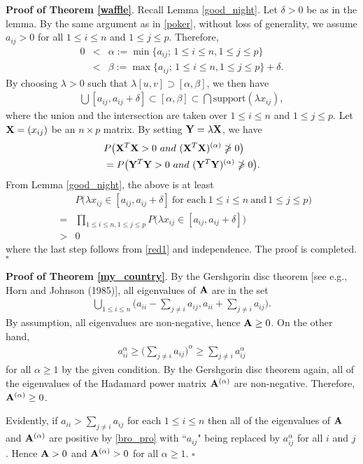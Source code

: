 \documentclass[conference,letterpaper]{IEEEtran}
\numberwithin{equation}{section}
\newcommand{\lbl}{\label}
\newcommand{\bd}{\bold}
\newcommand{\beaa}{\begin{eqnarray*}}
\newcommand{\eeaa}{\end{eqnarray*}}
\newcommand{\bea}{\begin{eqnarray}}
\newcommand{\eea}{\end{eqnarray}}
\begin{document}
\noindent\textbf{Proof of Theorem \ref{waffle}}. Recall Lemma \ref{good_night}. Let $\delta >0$ be as in the lemma. By the same argument as in \eqref{poker}, without loss of generality, we assume  $a_{ij}>0$ for all $1\leq i\leq n$ and $1\leq j \leq p.$ Therefore,
\beaa
0&<&\alpha:=\min\{a_{ij};\, 1\leq i \leq n, 1\leq j \leq p\}\\
&<& \beta:=\max\{a_{ij};\, 1\leq i\leq n, 1\leq j \leq p\}+\delta.
\eeaa
By choosing $\lambda>0$ such that $\lambda [u, v]\supset [\alpha , \beta]$, we then have
\bea\lbl{red1}
\bigcup [a_{ij}, a_{ij}+\delta] \subset [\alpha, \beta]\subset \bigcap   \mbox{support}(\lambda x_{ij}),
\eea
where the union and the intersection are taken over $1\leq i\leq n$ and $1\leq j \leq p.$ Let $\bd{X}=(x_{ij})$ be an $n\times p $ matrix.
By setting $\bd{Y}=\lambda\bd{X}$, we have
\beaa
& P\big(\bd{X}^T\bd{X}>0\ \mbox{and}\ (\bd{X}^T\bd{X})^{(\alpha)}\ngeqslant 0\big)\\
& =  P\big(\bd{Y}^T\bd{Y}>0\ \mbox{and}\ (\bd{Y}^T\bd{Y})^{(\alpha)}\ngeqslant 0\big).
\eeaa
From Lemma \ref{good_night}, the above is at least
\beaa
&& P\big(\lambda x_{ij}\in [a_{ij}, a_{ij}+\delta]\ \mbox{for each}\ 1\leq i\leq n\ \mbox{and}\, 1\leq j \leq p\big)\\
&=& \prod_{1\leq i\leq n, 1\leq j \leq p}P\big(\lambda x_{ij}\in [a_{ij}, a_{ij}+\delta]\big)\\
&>& 0
\eeaa
where the last step follows from \eqref{red1} and independence. The proof is completed. \hfill$\square$

\medskip

\noindent\textbf{Proof of Theorem \ref{my_country}}. By the Gershgorin disc theorem [see e.g., Horn and Johnson (1985)], all eigenvalues of $\bd{A}$ are in the set
\bea\lbl{bro_pro}
\bigcup_{1\leq i \leq n}\Big(a_{ii}- \sum_{j\ne i}a_{ij}, a_{ii}+ \sum_{j\ne i}a_{ij}\Big).
\eea
By assumption, all eigenvalues are non-negative, hence $\bd{A}\geq 0$. On the other hand,
\beaa
a_{ii}^{\alpha}\geq  \Big(\sum_{j\ne i}a_{ij}\Big)^{\alpha}\geq \sum_{j\ne i}a_{ij}^{\alpha}
\eeaa
for all $\alpha\geq 1$ by the given condition. By the Gershgorin disc theorem again, all of the eigenvalues of the Hadamard power matrix $\bd{A}^{(\alpha)}$ are non-negative. Therefore,  $\bd{A}^{(\alpha)}\geq  0$.

Evidently, if $a_{ii}>  \sum_{j\ne i}a_{ij}$ for each $1\leq i\leq n$ then all of the eigenvalues of  $\bd{A}$  and $\bd{A}^{(\alpha)}$ are positive by \eqref{bro_pro} with ``$a_{ij}$" being replaced by $a_{ij}^{\alpha}$ for all $i$ and $j$. Hence $\bd{A} > 0$ and $\bd{A}^{(\alpha)}> 0$ for all $\alpha\geq 1.$ \hfill$\square$\\
\end{document}
